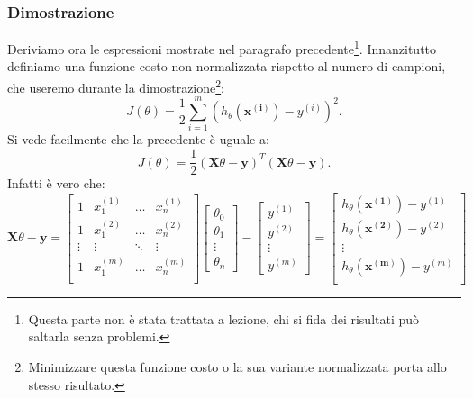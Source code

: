 \subsubsection{Dimostrazione}
Deriviamo ora le espressioni mostrate nel paragrafo precedente\footnote{Questa parte non è stata trattata a lezione, chi si fida dei risultati può saltarla senza problemi.}. Innanzitutto definiamo una funzione costo non normalizzata rispetto al numero di campioni, che useremo durante la dimostrazione\footnote{Minimizzare questa funzione costo o la sua variante normalizzata porta allo stesso risultato.}:
\begin{equation}\label{eq:J_sum}
J(\theta) = \frac{1}{2} \sum_{i=1}^m (h_\theta(\mathbf{x^{(i)}})-y^{(i)})^2.
\end{equation}
Si vede facilmente che la precedente è uguale a:
\begin{equation}\label{eq:J_matrix}
J(\theta) = \frac{1}{2} (\mathbf{X}\theta - \mathbf{y})^T (\mathbf{X}\theta - \mathbf{y}).
\end{equation}
Infatti è vero che:
\begin{equation*}
\mathbf{X}\theta - \mathbf{y} = \begin{bmatrix}
 1 & x_1^{(1)} & \dots & x_n^{(1)} \\
 1 & x_1^{(2)} & \dots & x_n^{(2)} \\
\vdots &\vdots &\ddots &\vdots  \\
1 & x_1^{(m)} & \dots & x_n^{(m)} \\
 \end{bmatrix}
 \begin{bmatrix}
 \theta_0 \\  \theta_1 \\ \vdots \\ \theta_n
 \end{bmatrix}
 -
  \begin{bmatrix}
 y^{(1)}\\  y^{(2)} \\ \vdots \\ y^{(m)}
 \end{bmatrix}
 =
 \begin{bmatrix}
 h_\theta(\mathbf{x^{(1)}}) - y^{(1)} \\
  h_\theta(\mathbf{x^{(2)}}) - y^{(2)} \\
  \vdots \\
   h_\theta(\mathbf{x^{(m)}}) - y^{(m)} \\
 \end{bmatrix}
\end{equation*}
